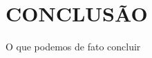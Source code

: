 \documentclass[a4paper,12pt]{article}
\begin{document}
\thispagestyle{main}

\section{CONCLUSÃO}\hspace{4ex}
O que podemos de fato concluir

\newpage




{}


\appendix


\end{document}
